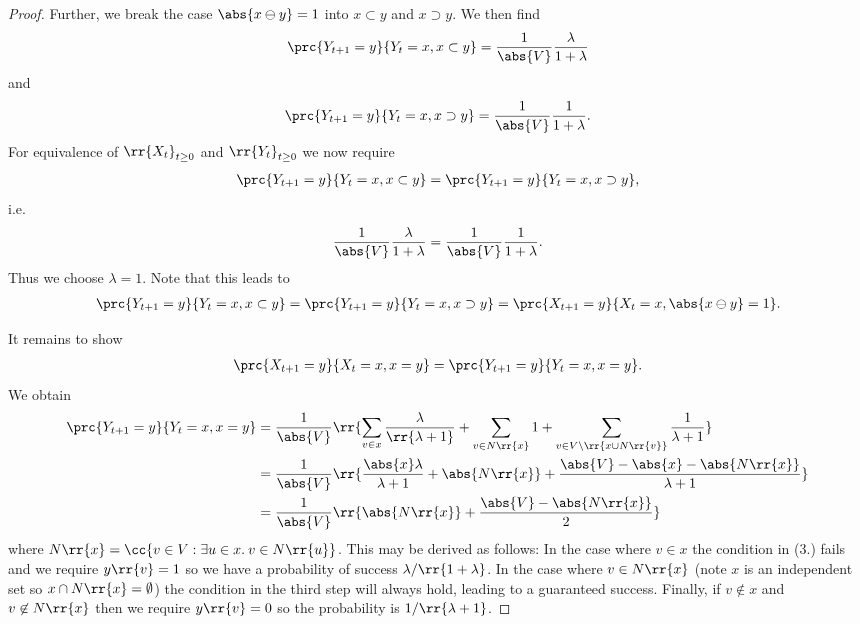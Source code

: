 \documentclass{article}
\begin{document}
\begin{claim*}[1]
\begin{proof}
    Further, we break the case $\abs{x\ominus y}=1$
    into $x\subset y$ and $x\supset y$. We then find
    \begin{align*}
      \prc{Y_{t+1}=y}{Y_t=x, x\subset y} = \frac{1}{\abs{V}} \frac{\lambda}{1+\lambda}
    \end{align*}
    and
    \begin{align*}
      \prc{Y_{t+1}=y}{Y_t=x, x\supset y} = \frac{1}{\abs{V}} \frac{1}{1+\lambda}.
    \end{align*}
    For equivalence of $\rr{X_t}_{t\geq 0}$ and $\rr{Y_t}_{t\geq 0}$ we now require
    \begin{align*}
      \prc{Y_{t+1}=y}{Y_t=x, x\subset y} = \prc{Y_{t+1}=y}{Y_t=x, x\supset y},
    \end{align*}
    i.e.
    \begin{align*}
      \frac{1}{\abs{V}} \frac{\lambda}{1+\lambda} = \frac{1}{\abs{V}} \frac{1}{1+\lambda}.
    \end{align*}
    Thus we choose $\lambda = 1$. Note that this leads to
    \begin{align*}
      \prc{Y_{t+1}=y}{Y_t=x, x\subset y} = \prc{Y_{t+1}=y}{Y_t=x, x\supset y}=\prc{X_{t+1}=y}{X_t=x, \abs{x\ominus y}=1}.
    \end{align*}

    It remains to show
    \begin{align}
      \label{eq:equal-case}
      \prc{X_{t+1}=y}{X_t=x, x=y}= \prc{Y_{t+1}=y}{Y_t=x, x=y}.
    \end{align}
    We obtain
    \begin{align*}
      \prc{Y_{t+1}=y}{Y_t=x, x=y}
      &= \frac{1}{\abs{V}} \rr{\sum_{v\in x} \frac{\lambda}{\rr{\lambda + 1}} + \sum_{v\in N\rr{x}} 1 + \sum_{v\in V\setminus\rr{x\cup N\rr{v}}} \frac{1}{\lambda+1}} \\
      &= \frac{1}{\abs{V}} \rr{\frac{\abs{x}\lambda}{\lambda + 1} + \abs{N\rr{x}} + \frac{\abs{V}-\abs{x}-\abs{N\rr{x}}}{\lambda + 1}} \\
      &= \frac{1}{\abs{V}} \rr{\abs{N\rr{x}} + \frac{\abs{V}-\abs{N\rr{x}}}{2}}
    \end{align*}
    where $N\rr{x}=\cc{v \in V : \exists u\in x. \: v\in N\rr{u}}$. This may be derived as follows:
    In the case where $v\in x$ the condition in (3.) fails and we require $y\rr{v}=1$ so we have
    a probability of success $\lambda/\rr{1+\lambda}$. In the case where $v\in N\rr{x}$ (note $x$
    is an independent set so $x\cap N\rr{x}=\emptyset$) the condition in the third step will
    always hold, leading to a guaranteed success. Finally, if $v\not\in x$ and $v\not\in N\rr{x}$
    then we require $y\rr{v}=0$ so the probability is $1/\rr{\lambda + 1}$.


\end{proof}
\end{claim*}
\end{document}
